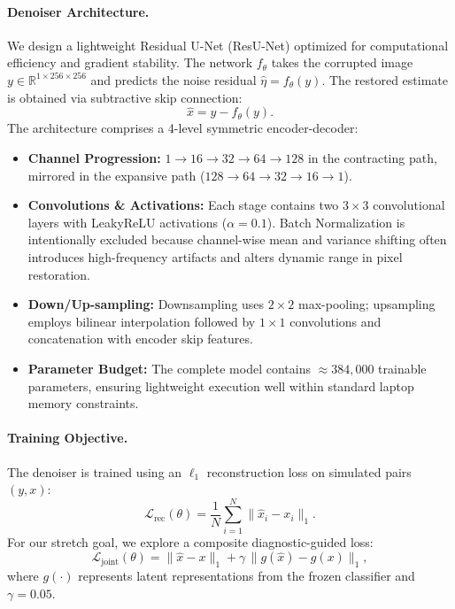 \documentclass[11pt]{article}
\begin{document}
\paragraph{Denoiser Architecture.}
We design a lightweight Residual U-Net (ResU-Net) optimized for computational efficiency and gradient stability. The network $f_\theta$ takes the corrupted image $y \in \mathbb{R}^{1 \times 256 \times 256}$ and predicts the noise residual $\hat{\eta} = f_\theta(y)$. The restored estimate is obtained via subtractive skip connection:
\begin{equation}
  \hat{x} = y - f_\theta(y).
\end{equation}
The architecture comprises a 4-level symmetric encoder-decoder:
\begin{itemize}[leftmargin=*,noitemsep]
  \item \textbf{Channel Progression:} $1 \to 16 \to 32 \to 64 \to 128$ in the contracting path, mirrored in the expansive path ($128 \to 64 \to 32 \to 16 \to 1$).
  \item \textbf{Convolutions \& Activations:} Each stage contains two $3 \times 3$ convolutional layers with LeakyReLU activations ($\alpha = 0.1$). Batch Normalization is intentionally excluded because channel-wise mean and variance shifting often introduces high-frequency artifacts and alters dynamic range in pixel restoration.
  \item \textbf{Down/Up-sampling:} Downsampling uses $2 \times 2$ max-pooling; upsampling employs bilinear interpolation followed by $1 \times 1$ convolutions and concatenation with encoder skip features.
  \item \textbf{Parameter Budget:} The complete model contains $\approx 384{,}000$ trainable parameters, ensuring lightweight execution well within standard laptop memory constraints.
\end{itemize}

\paragraph{Training Objective.}
The denoiser is trained using an $\ell_1$ reconstruction loss on simulated pairs $(y, x)$:
\begin{equation}
  \mathcal{L}_{\mathrm{rec}}(\theta) = \frac{1}{N} \sum_{i=1}^N \|\hat{x}_i - x_i\|_1.
  \label{eq:l1_loss}
\end{equation}
For our stretch goal, we explore a composite diagnostic-guided loss:
\begin{equation}
  \mathcal{L}_{\mathrm{joint}}(\theta) = \|\hat{x} - x\|_1 + \gamma \, \|g(\hat{x}) - g(x)\|_1,
  \label{eq:joint_loss}
\end{equation}
where $g(\cdot)$ represents latent representations from the frozen classifier and $\gamma = 0.05$.
\end{document}
